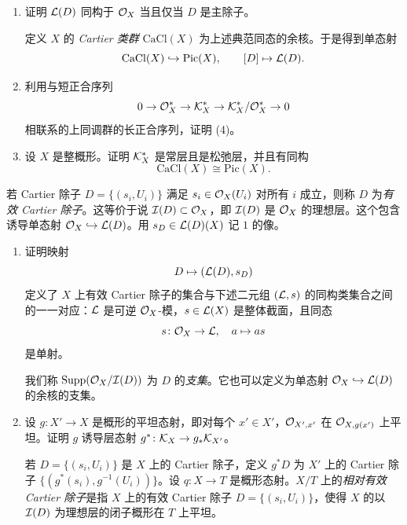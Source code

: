 \begin{exercises}
\begin{enumerate}[label=(\arabic*),leftmargin=2.4em]
  若 Cartier 除子落在典范同态
  \[
  \Gamma(X,\cK_X^{*})\to\Gamma(X,\cK_X^{*}/\cO_X^{*})
  \]
  的像中，则称它为\emph{主除子}。

  \item 证明 $\mathcal{L}(D)$ 同构于 $\mathcal{O}_X$ 当且仅当 $D$ 是主除子。

  定义 $X$ 的 \emph{Cartier 类群} $\mathrm{CaCl}(X)$ 为上述典范同态的余核。于是得到单态射
  \[
  \mathrm{CaCl}(X)\hookrightarrow\mathrm{Pic}(X),\qquad [D]\mapsto\mathcal{L}(D).
  \]

  \item 利用与短正合序列
  \[
  0\to\mathcal{O}_X^{*}\to\mathcal{K}_X^{*}\to\mathcal{K}_X^{*}/\mathcal{O}_X^{*}\to 0
  \]
  相联系的上同调群的长正合序列，证明 (4)。
  \item 设 $X$ 是整概形。证明 $\mathcal{K}_X^{*}$ 是常层且是松弛层，并且有同构
  \[
  \mathrm{CaCl}(X)\cong\mathrm{Pic}(X).
  \]
\end{enumerate}

若 Cartier 除子 $D=\{(s_i,U_i)\}$ 满足 $s_i\in\mathcal{O}_X(U_i)$ 对所有 $i$ 成立，则称 $D$ 为\emph{有效 Cartier 除子}。这等价于说 $\mathcal{I}(D)\subset\mathcal{O}_X$，即 $\mathcal{I}(D)$ 是 $\mathcal{O}_X$ 的理想层。这个包含诱导单态射 $\mathcal{O}_X\hookrightarrow\mathcal{L}(D)$。用 $s_D\in\mathcal{L}(D)(X)$ 记 $1$ 的像。

\begin{enumerate}[label=(\arabic*),leftmargin=2.4em,start=7]
  \item 证明映射
  \[
  D\mapsto(\mathcal{L}(D),s_D)
  \]
  定义了 $X$ 上有效 Cartier 除子的集合与下述二元组 $(\mathcal{L},s)$ 的同构类集合之间的一一对应：$\mathcal{L}$ 是可逆 $\mathcal{O}_X$-模，$s\in\mathcal{L}(X)$ 是整体截面，且同态
  \[
  s\colon\mathcal{O}_X\to\mathcal{L},\quad a\mapsto as
  \]
  是单射。

  我们称 $\operatorname{Supp}(\mathcal{O}_X/\mathcal{I}(D))$ 为 $D$ 的\emph{支集}。它也可以定义为单态射 $\mathcal{O}_X\hookrightarrow\mathcal{L}(D)$ 的余核的支集。

  \item 设 $g\colon X'\to X$ 是概形的平坦态射，即对每个 $x'\in X'$，$\mathcal{O}_{X',x'}$ 在 $\mathcal{O}_{X,g(x')}$ 上平坦。证明 $g$ 诱导层态射 $g^{*}\colon\mathcal{K}_X\to g_*\mathcal{K}_{X'}$。

  若 $D=\{(s_i,U_i)\}$ 是 $X$ 上的 Cartier 除子，定义 $g^{*}D$ 为 $X'$ 上的 Cartier 除子 $\{(g^{*}(s_i),g^{-1}(U_i))\}$。设 $q\colon X\to T$ 是概形态射。$X/T$ 上的\emph{相对有效 Cartier 除子}是指 $X$ 上的有效 Cartier 除子 $D=\{(s_i,U_i)\}$，使得 $X$ 的以 $\mathcal{I}(D)$ 为理想层的闭子概形在 $T$ 上平坦。


\end{enumerate}
\end{exercises}
